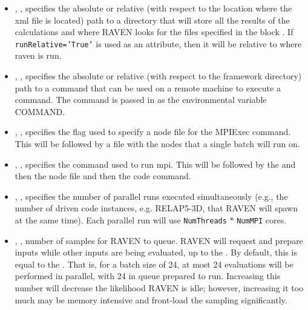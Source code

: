 \begin{itemize}
\item {}, ,
  specifies the absolute or relative (with respect to the location
  where the xml file is located) path to a directory that will store
  all the results of the calculations and where RAVEN looks for the
  files specified in the block .  If
  \texttt{runRelative='True'} is used as an attribute, then it will be
  relative to where raven is run.
%


\item {}, ,
  specifies the absolute or relative (with respect to the framework
  directory) path to a command that can be used on a remote machine to
  execute a command.  The command is passed in as the environmental
  variable COMMAND.
%


\item {}, ,
  specifies the flag used to specify a node file for the MPIExec command.  This will be followed by a file with the nodes that a single batch will run on.

\item {}, , specifies the command used to run mpi.  This will be followed by the  and then the node file and then the code command.

\item {}, ,
  specifies the number of parallel runs executed simultaneously (e.g.,
  the number of driven code instances, e.g. RELAP5-3D, that RAVEN will
  spawn at the same time).  Each parallel run will use
  \texttt{NumThreads} $*$ \texttt{NumMPI} cores.
%

\item {}, ,
  number of samples for RAVEN to queue.  RAVEN will request and prepare inputs
  while other inputs are being evaluated, up to the .  By
  default, this is equal to the .  That is, for a batch size of 24,
  at most 24 evaluations will be performed in parallel, with 24 in queue prepared to run.
  Increasing this number will decrease the likelihood RAVEN is idle; however, increasing
  it too much may be memory intensive and front-load the sampling significantly.
%


\end{itemize}
